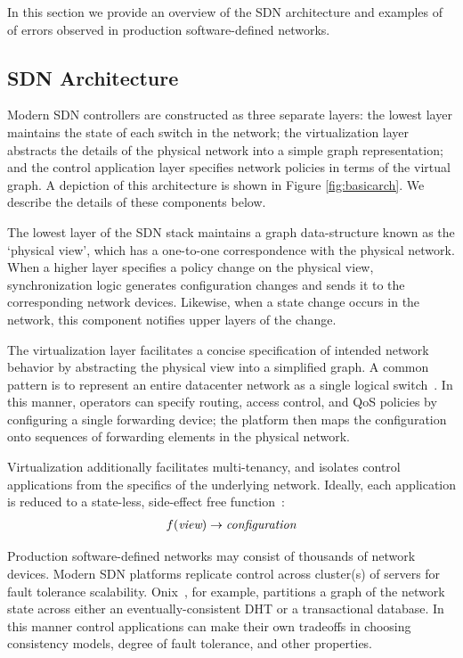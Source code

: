 In this section we provide an overview of the SDN architecture and examples of  
of errors observed in production software-defined networks.

\subsection{SDN Architecture}

Modern SDN controllers are constructed as three separate layers:
the lowest layer maintains the state of each switch in the network; the virtualization layer 
abstracts the details of the physical network into a simple graph representation;
and the control application layer specifies network policies in terms of the
virtual graph. A depiction of this architecture is shown in Figure \ref{fig:basicarch}.
We describe the details of these components below.

The lowest layer of the SDN stack maintains a graph data-structure known as
the `physical view', which has a one-to-one correspondence with the physical
network. When a higher layer specifies a policy change on the physical view,
synchronization logic generates configuration changes and sends it to the
corresponding network devices. Likewise, when a state change
occurs in the network, this component notifies upper layers of the change.

The virtualization layer facilitates a concise specification of
intended network behavior by abstracting the physical view into a simplified
graph. A common pattern is to represent an entire
datacenter network as a single logical
switch~\cite{Casado:2010:VNF:1921151.1921162}. In this manner, operators
can specify routing, access control, and QoS policies by configuring a single forwarding
device; the platform then maps the configuration onto sequences 
of forwarding elements in the physical network.

Virtualization additionally facilitates multi-tenancy, and isolates control applications from the specifics
of the underlying network. Ideally, each application is reduced to a
state-less, side-effect free function~\cite{keynote}:
\begin{align*}
f(\text{\it view}) \rightarrow \text{\it configuration}
\end{align*}

Production software-defined networks may consist of thousands of network
devices. Modern SDN platforms replicate control across cluster(s) of servers
for fault tolerance scalability.
Onix~\cite{onix}, for example,
partitions a graph of the network state across either an eventually-consistent
DHT or a transactional database. In this manner control applications can make their own
tradeoffs in choosing consistency models, degree of
fault tolerance, and other properties.

